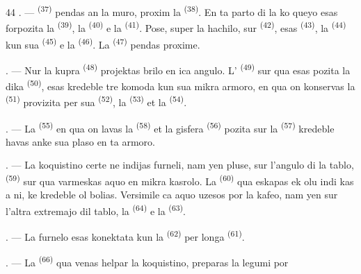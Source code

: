 \begin{VUpage}[46]{44}
. ---  \textsuperscript{(37)} pendas an la muro,\nl
proxim la  \textsuperscript{(38)}. En ta parto di la ko\cc
queyo esas forpozita la  \textsuperscript{(39)}, la \cc
{} \textsuperscript{(40)} e la  \textsuperscript{(41)}. Pose, super la\nl
hachilo, sur  \textsuperscript{(42)}, esas  \textsuperscript{(43)}, la \cc
{} \textsuperscript{(44)} kun sua  \textsuperscript{(45)} e la  \textsuperscript{(46)}.\nl
La  \textsuperscript{(47)} pendas proxime.

. --- Nur la kupra  \textsuperscript{(48)} projektas\nl
brilo en ica angulo. L' \textsuperscript{(49)} sur qua esas\nl
pozita la dika  \textsuperscript{(50)}, esas kredeble tre\nl
komoda kun sua mikra armoro, en qua on\nl
konservas la  \textsuperscript{(51)} provizita per\nl
sua  \textsuperscript{(52)}, la  \textsuperscript{(53)} et la \cc
{} \textsuperscript{(54)}.

\VUsaut{4.0mm}
\VUsaut{3.0mm}

. --- La  \textsuperscript{(55)} en qua on lavas la \cc
{} \textsuperscript{(58)} et la gisfera  \textsuperscript{(56)} pozita sur la\nl
{} \textsuperscript{(57)} kredeble havas anke sua plaso\nl
en ta armoro.

. --- La koquistino certe ne indijas furneli,\nl
nam yen pluse, sur l'angulo di la tablo, \cc
{} \textsuperscript{(59)} sur qua varmeskas aquo en mikra\nl
kasrolo. La  \textsuperscript{(60)} qua eskapas ek olu indi\cc
kas a ni, ke kredeble ol bolias. Versimile ca\nl
aquo uzesos por la kafeo, nam yen sur l'altra\nl
extremajo dil tablo, la  \textsuperscript{(64)} e la\nl
{} \textsuperscript{(63)}.

. --- La furnelo esas konektata kun la \cc
{} \textsuperscript{(62)} per longa  \textsuperscript{(61)}.

. --- La  \textsuperscript{(66)} qua venas\nl
helpar la koquistino, preparas la legumi por
\parplein
\end{VUpage}

